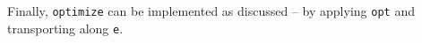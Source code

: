 Finally, \texttt{optimize} can be implemented as discussed -- by applying \texttt{opt} and
transporting along \texttt{e}.

\begin{code}%
\>[0]\AgdaSpace{}%
\AgdaSymbol{:}\AgdaSpace{}%
\AgdaSymbol{(}\AgdaSpace{}%
\AgdaSymbol{:}\AgdaSpace{}%
\AgdaSymbol{)}\AgdaSpace{}%
\AgdaSpace{}%
\AgdaFunction{Σ[}\AgdaSpace{}%
\AgdaSpace{}%
\AgdaSpace{}%
\AgdaSpace{}%
\AgdaFunction{]}\AgdaSpace{}%
\AgdaSpace{}%
\AgdaSpace{}%
\<%
\\
\>[0]\AgdaSpace{}%
\AgdaSpace{}%
\AgdaSymbol{=}\AgdaSpace{}%
\AgdaSpace{}%
\AgdaSpace{}%
\AgdaSymbol{(}\AgdaSpace{}%
\AgdaSpace{}%
\AgdaSymbol{)}\<%
\end{code}
